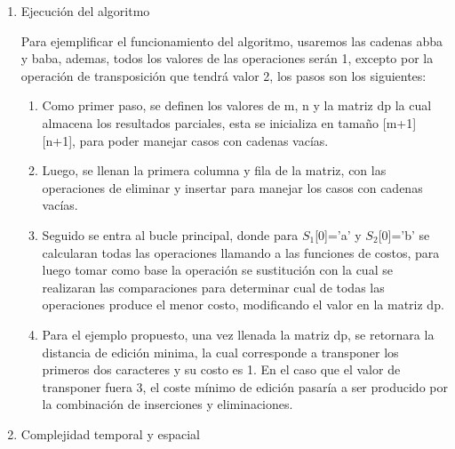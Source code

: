 \begin{enumerate}[1)]
\begin{algorithm}[H]
{{{                
            }
            }

            \;
    }

\end{algorithm}

\item Ejecución del algoritmo

Para ejemplificar el funcionamiento del algoritmo, usaremos las cadenas
abba y baba, ademas, todos los valores de las operaciones serán 1, excepto
por la operación de transposición que tendrá valor 2, los pasos son los siguientes:

\begin{enumerate}[1)]
    \item Como primer paso, se definen los valores de m, n y la matriz dp la cual almacena
    los resultados parciales, esta se inicializa en tamaño [m+1][n+1], para poder manejar
    casos con cadenas vacías.

\item Luego, se llenan la primera columna y fila de la matriz, con las operaciones
de eliminar y insertar para manejar los casos con cadenas vacías.

\item Seguido se entra al bucle principal, donde para $S_1$[0]='a' y $S_2$[0]='b' se calcularan
todas las operaciones llamando a las funciones de costos, para luego tomar como base la operación se sustitución con la cual
se realizaran las comparaciones para determinar cual de todas las operaciones produce el menor
costo, modificando el valor en la matriz dp.

\item Para el ejemplo propuesto, una vez llenada la matriz dp, se retornara la distancia
de edición minima, la cual corresponde a transponer los primeros dos caracteres y su costo es 1. En el caso que el valor de transponer fuera 3, el coste mínimo de edición
pasaría a ser producido por la combinación de inserciones y eliminaciones.

\end{enumerate}


    \item Complejidad temporal y espacial
    

\end{enumerate}

